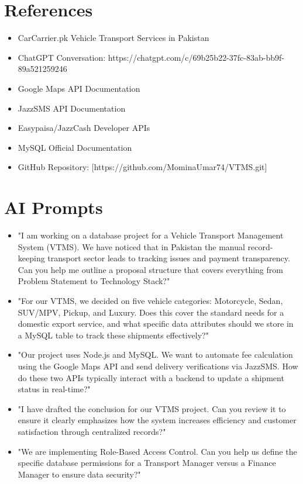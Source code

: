 \documentclass[12pt,a4paper]{article}
\begin{document}
\section{ References}
\begin{itemize}
    \item CarCarrier.pk Vehicle Transport Services in Pakistan
   \item ChatGPT Conversation: https://chatgpt.com/c/69b25b22-37fc-83ab-bb9f-89a521259246
   \item Google Maps API Documentation
   \item JazzSMS API Documentation
   \item Easypaisa/JazzCash Developer APIs
    \item MySQL Official Documentation
    \item GitHub Repository: [https://github.com/MominaUmar74/VTMS.git]

\end{itemize}
\section{AI Prompts}
\begin{itemize}
    \item "I am working on a database project for a Vehicle Transport Management System (VTMS). We have noticed that in Pakistan the manual record-keeping transport sector leads to tracking issues and payment transparency. Can you help me outline a proposal structure that covers everything from Problem Statement to Technology Stack?"
   \item "For our VTMS, we decided on five vehicle categories: Motorcycle, Sedan, SUV/MPV, Pickup, and Luxury. Does this cover the standard needs for a domestic export service, and what specific data attributes should we store in a MySQL table to track these shipments effectively?"
  \item "Our project uses Node.js and MySQL. We want to automate fee calculation using the Google Maps API and send delivery verifications via JazzSMS. How do these two APIs typically interact with a backend to update a shipment status in real-time?"
\item  "I have drafted the conclusion for our VTMS project. Can you review it to ensure it clearly emphasizes how the system increases efficiency and customer satisfaction through centralized records?"
\item "We are implementing Role-Based Access Control. Can you help us define the specific database permissions for a Transport Manager versus a Finance Manager to ensure data security?"

\end{itemize}
\end{document}
